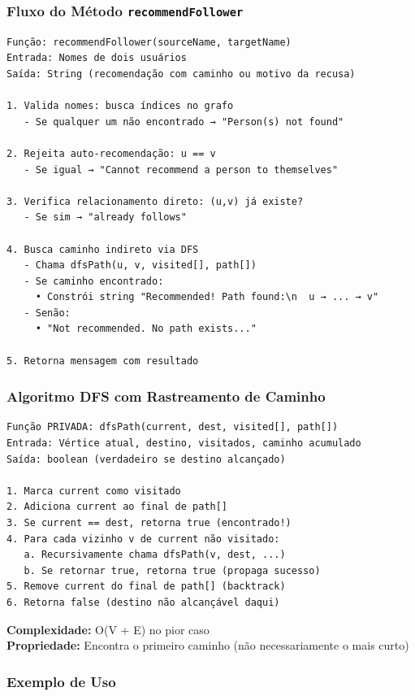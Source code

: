 \documentclass[12pt,a4paper]{article}
\begin{document}
    \subsubsection{Fluxo do Método \texttt{recommendFollower}}

    \begin{verbatim}
Função: recommendFollower(sourceName, targetName)
Entrada: Nomes de dois usuários
Saída: String (recomendação com caminho ou motivo da recusa)

1. Valida nomes: busca índices no grafo
   - Se qualquer um não encontrado → "Person(s) not found"

2. Rejeita auto-recomendação: u == v
   - Se igual → "Cannot recommend a person to themselves"

3. Verifica relacionamento direto: (u,v) já existe?
   - Se sim → "already follows"

4. Busca caminho indireto via DFS
   - Chama dfsPath(u, v, visited[], path[])
   - Se caminho encontrado:
     • Constrói string "Recommended! Path found:\n  u → ... → v"
   - Senão:
     • "Not recommended. No path exists..."

5. Retorna mensagem com resultado
    \end{verbatim}

    \subsubsection{Algoritmo DFS com Rastreamento de Caminho}

    \begin{verbatim}
Função PRIVADA: dfsPath(current, dest, visited[], path[])
Entrada: Vértice atual, destino, visitados, caminho acumulado
Saída: boolean (verdadeiro se destino alcançado)

1. Marca current como visitado
2. Adiciona current ao final de path[]
3. Se current == dest, retorna true (encontrado!)
4. Para cada vizinho v de current não visitado:
   a. Recursivamente chama dfsPath(v, dest, ...)
   b. Se retornar true, retorna true (propaga sucesso)
5. Remove current do final de path[] (backtrack)
6. Retorna false (destino não alcançável daqui)
    \end{verbatim}

    \textbf{Complexidade:} O(V + E) no pior caso \\
    \textbf{Propriedade:} Encontra o primeiro caminho (não necessariamente o mais curto)

    \subsubsection{Exemplo de Uso}
\end{document}
